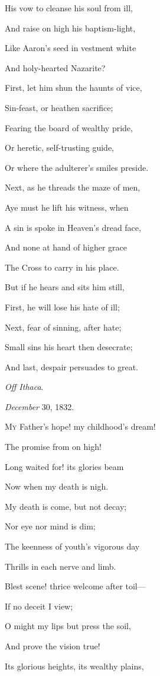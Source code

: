 His vow to cleanse his soul from ill,

And raise on high his baptism-light,

Like Aaron's seed in vestment white

And holy-hearted Nazarite?

First, let him shun the haunts of vice,

Sin-feast, or heathen sacrifice;

Fearing the board of wealthy pride,

Or heretic, self-trusting guide,

Or where the adulterer's smiles preside.

Next, as he threads the maze of men,

Aye must he lift his witness, when

A sin is spoke in Heaven's dread face,

And none at hand of higher grace

The Cross to carry in his place. 

But if he hears and sits him still,

First, he will lose his hate of ill;

Next, fear of sinning, after hate;

Small sins his heart then desecrate;

And last, despair persuades to great.

\emph{Off Ithaca}.

\emph{December} 30, 1832.


M\textsc{y} Father's hope! my childhood's dream!

The promise from on high!

Long waited for! its glories beam

Now when my death is nigh.

My death is come, but not decay;

Nor eye nor mind is dim;

The keenness of youth's vigorous day

Thrills in each nerve and limb.

Blest scene! thrice welcome after toil—

If no deceit I view;

O might my lips but press the soil,

And prove the vision true! 

Its glorious heights, its wealthy plains,

